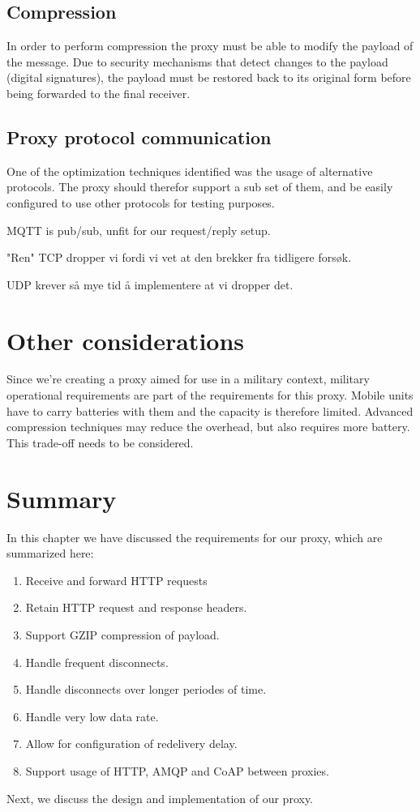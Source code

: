 \subsection{Compression}

In order to perform compression the proxy must be able to modify the payload of
the message. Due to security mechanisms that detect changes to the
payload (digital signatures), the payload must be restored back to its original form
before being forwarded to the final receiver.

\subsection{Proxy protocol communication}

One of the optimization techniques identified was the usage of alternative
protocols. The proxy should therefor support a sub set of them, and be easily
configured to use other protocols for testing purposes.

MQTT is pub/sub, unfit for our request/reply setup.

"Ren" TCP dropper vi fordi vi vet at den brekker fra tidligere forsøk.

UDP krever så mye tid å implementere at vi dropper det.


\section{Other considerations}

Since we're creating a proxy aimed for use in a military context, military
operational requirements are part of the requirements for this proxy. Mobile
units have to carry batteries with them and the capacity is therefore limited.
Advanced compression techniques may reduce the overhead, but also requires more
battery. This trade-off needs to be considered.


\section{Summary}

In this chapter we have discussed the requirements for our proxy, which are
summarized here:

\begin{enumerate}
    \item Receive and forward HTTP requests
    \item Retain HTTP request and response headers.
    \item Support GZIP compression of payload.
    \item Handle frequent disconnects.
    \item Handle disconnects over longer periodes of time.
    \item Handle very low data rate.
    \item Allow for configuration of redelivery delay.
    \item Support usage of HTTP, AMQP and CoAP between proxies.
\end{enumerate}

Next, we discuss the design and implementation of our proxy.
